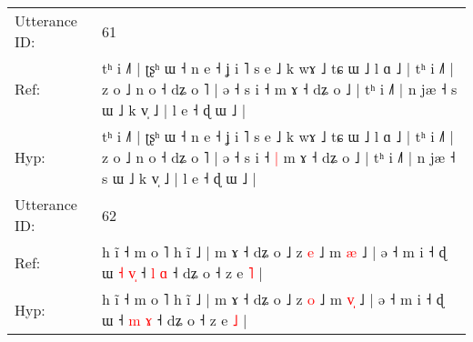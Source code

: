 \documentclass[10pt]{article}
\DeclareRobustCommand{\hl}[1]{{\textcolor{red}{#1}}}
\begin{document}
\begin{longtable}{ll}
 \\
\midrule
Utterance ID: & 61 \\
Ref: & tʰ i ˩˥ | ʈʂʰ ɯ ˧ n e ˧ ʝ i ˥ s e ˩ k wɤ ˩ tɕ ɯ ˩ l ɑ ˩ | tʰ i ˩˥ | z o ˩ n o ˧ dʑ o ˥ | ə ˧ s i ˧\hl{}\hl{} m ɤ ˧ dʑ o ˩ | tʰ i ˩˥ | n jæ ˧ s ɯ ˩ k v̩ ˩ | l e ˧ ɖ ɯ ˩ |
 \\
Hyp: & tʰ i ˩˥ | ʈʂʰ ɯ ˧ n e ˧ ʝ i ˥ s e ˩ k wɤ ˩ tɕ ɯ ˩ l ɑ ˩ | tʰ i ˩˥ | z o ˩ n o ˧ dʑ o ˥ | ə ˧ s i ˧\hl{ }\hl{|} m ɤ ˧ dʑ o ˩ | tʰ i ˩˥ | n jæ ˧ s ɯ ˩ k v̩ ˩ | l e ˧ ɖ ɯ ˩ |
 \\
\midrule
Utterance ID: & 62 \\
Ref: & h ĩ ˧ m o ˥ h ĩ ˩ | m ɤ ˧ dʑ o ˩ z \hl{e} ˩ m \hl{}\hl{æ} ˩ | ə ˧ m i ˧ ɖ ɯ\hl{ }\hl{˧}\hl{ }\hl{v}\hl{̩} ˧ \hl{l} \hl{ɑ} ˧ dʑ o ˧ z e \hl{˥} |
 \\
Hyp: & h ĩ ˧ m o ˥ h ĩ ˩ | m ɤ ˧ dʑ o ˩ z \hl{o} ˩ m \hl{v}\hl{̩} ˩ | ə ˧ m i ˧ ɖ ɯ\hl{}\hl{}\hl{}\hl{}\hl{} ˧ \hl{m} \hl{ɤ} ˧ dʑ o ˧ z e \hl{˩} |
 \\
\midrule
\end{longtable}
\end{document}
